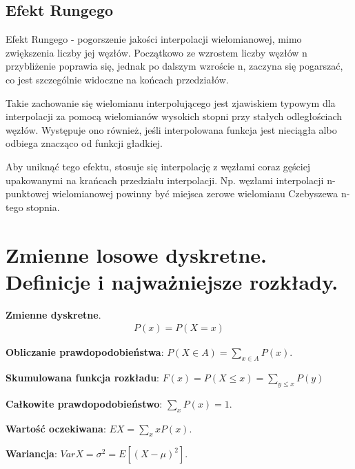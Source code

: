 \documentclass[12pt]{article}
\begin{document}
    \subsection{Efekt Rungego}

    Efekt Rungego - pogorszenie jakości interpolacji wielomianowej, mimo zwiększenia liczby jej węzłów. Początkowo ze wzrostem liczby węzłów n przybliżenie poprawia się, jednak po dalszym wzroście n, zaczyna się pogarszać, co jest szczególnie widoczne na końcach przedziałów.

    Takie zachowanie się wielomianu interpolującego jest zjawiskiem typowym dla interpolacji za pomocą wielomianów wysokich stopni przy stałych odległościach węzłów. Występuje ono również, jeśli interpolowana funkcja jest nieciągła albo odbiega znacząco od funkcji gładkiej.

    Aby uniknąć tego efektu, stosuje się interpolację z węzłami coraz gęściej upakowanymi na krańcach przedziału interpolacji. Np. węzłami interpolacji n-punktowej wielomianowej powinny być miejsca zerowe wielomianu Czebyszewa n-tego stopnia.

    \newpage

    \section{Zmienne losowe dyskretne. Definicje i najważniejsze rozkłady.}

    \begin{definition}
        \textbf{Zmienne dyskretne}.
        \begin{align*}
            P(x) = P(X=x)
        \end{align*}

        \textbf{Obliczanie prawdopodobieństwa}: $P(X \in A) = \sum_{x \in A} P(x)$.


        \textbf{Skumulowana funkcja rozkładu}: $F(x) = P(X \leq x) = \sum_{y \leq x}P(y)$

        \textbf{Całkowite prawdopodobieństwo}: $\sum_{x}P(x) = 1$.

        \textbf{Wartość oczekiwana}: $EX = \sum_{x} x P(x)$.

        \textbf{Wariancja}: $VarX = \sigma^2 = E[ (X - \mu)^2 ]$.
    \end{definition}

\end{document}
